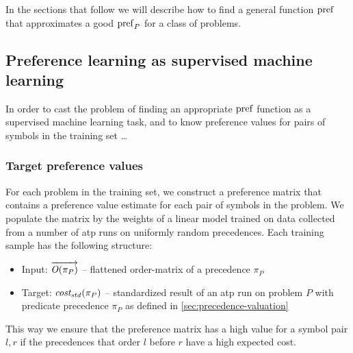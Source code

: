 In the sections that follow we will describe how to find a general function \(\operatorname{pref}\)
that approximates a good \(\operatorname{pref}_P\) for a class of problems.

\subsection{Preference learning as supervised machine learning}

In order to cast the problem of finding an appropriate \(\operatorname{pref}\) function
as a supervised machine learning task,
and to know preference values for pairs of symbols in the training set \ldots {}

\subsubsection{Target preference values}
\label{sec:target-preference-values}

For each problem in the training set, we construct a preference matrix that contains a preference
value estimate for each pair of symbols in the problem.
We populate the matrix by the weights of a linear model trained on data
collected from a number of \gls{atp} runs on uniformly random precedences.
Each training sample has the following structure:

\begin{itemize}
	\item Input: \(\overrightarrow{\operatorname{\mathit{O}}(\pi_P)}\) --
	flattened \gls{order-matrix} of a precedence \(\pi_P\)
	\item Target: \(\operatorname{\mathit{cost_{std}}}(\pi_P)\) --
	standardized result of an \gls{atp} run on problem \(P\) with predicate precedence \(\pi_P\)
	as defined in \autoref{sec:precedence-valuation}
\end{itemize}

This way we ensure that the preference matrix has a high value for a symbol pair \(l, r\)
if the precedences that order \(l\) before \(r\) have a high expected cost.

